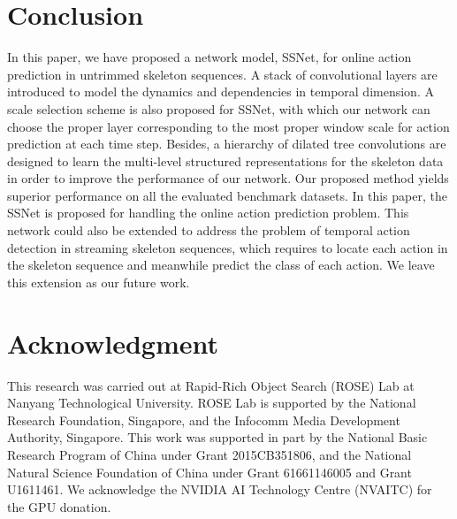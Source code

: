 \documentclass[10pt,twocolumn,letterpaper]{article}
\begin{document}
\section{Conclusion}
\label{sec:conclusion}
In this paper,
we have proposed a network model, SSNet, for online action prediction in untrimmed skeleton sequences.
A stack of convolutional layers are introduced to model the dynamics and dependencies in temporal dimension.
A scale selection scheme is also proposed for SSNet,
with which our network can choose the proper layer corresponding to the most proper window scale for action prediction at each time step.
Besides, a hierarchy of dilated tree convolutions are designed to learn the multi-level structured representations for the skeleton data in order to improve the performance of our network.
Our proposed method yields superior performance on all the evaluated benchmark datasets.
In this paper, the SSNet is proposed for handling the online action prediction problem.
This network could also be extended to address the problem of temporal action detection in streaming skeleton sequences,
which requires to locate each action in the skeleton sequence and meanwhile predict the class of each action.
We leave this extension as our future work.

\section*{Acknowledgment}

This research was carried out at Rapid-Rich Object Search (ROSE) Lab at Nanyang Technological University.
ROSE Lab is supported by the National Research Foundation, Singapore,
and the Infocomm Media Development Authority, Singapore.
This work was supported in part by the National Basic Research Program of China under Grant 2015CB351806, and the National Natural Science Foundation of China under Grant 61661146005 and Grant U1611461.
We acknowledge the NVIDIA AI Technology Centre (NVAITC) for the GPU donation.
\end{document}
